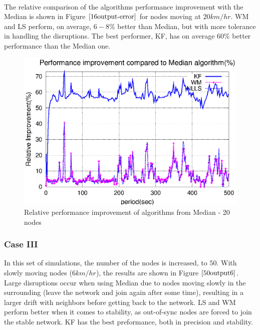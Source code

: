 \documentclass[a4paper,10pt]{report}
\begin{document}
\paragraph*{}
The relative comparison of the algorithms performance improvement
with the Median is shown in Figure $\ref{16output-error}$ for nodes
moving at $20km/hr$. WM and LS perform, on average, $6-8\%$ better
than Median, but with more tolerance in handling the disruptions.
The best performer, KF, has on average $60\%$ better performance
than the Median one.
\begin{figure}
\centering
\includegraphics[width= 0.7 \textwidth]{16output-error}
\caption{Relative performance improvement of algorithms from Median - 20 nodes} \label{16output-error}
\end{figure}
\subsubsection{\textbf{Case III}}
In this set of simulations, the number of the nodes is increased, to
$50$. With slowly moving nodes ($6km/hr$), the results are shown in
Figure $\ref{50output6}$. Large disruptions occur when using Median
due to nodes moving slowly in the surrounding (leave the network and
join again after some time), resulting in a larger drift with
neighbors before getting back to the network. LS and WM perform
better when it comes to stability, as out-of-sync nodes are forced
to join the stable network. KF has the best preformance, both in
precision and stability.
\end{document}
